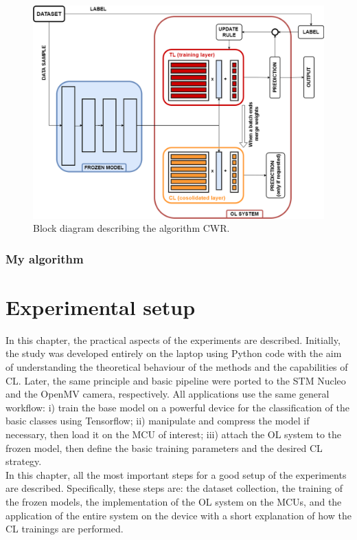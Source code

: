 \documentclass[12pt]{report}
\begin{document}
\begin{figure}[h!]
    \centering
    \includegraphics[width=120mm]{Figures/Chapter3/CWR.png} 
    \caption{Block diagram describing the algorithm CWR.}
    \label{fig:block_diag_CWR}    
\end{figure}

\subsection{My algorithm}




\chapter{Experimental setup}

In this chapter, the practical aspects of the experiments are described. Initially, the study was developed entirely on the laptop using Python code with the aim of understanding the theoretical behaviour of the methods and the capabilities of CL. Later, the same principle and basic pipeline were ported to the STM Nucleo and the OpenMV camera, respectively. All applications use the same general workflow: i) train the base model on a powerful device for the classification of the basic classes using Tensorflow; ii) manipulate and compress the model if necessary, then load it on the MCU of interest; iii) attach the OL system to the frozen model, then define the basic training parameters and the desired CL strategy. \\
In this chapter, all the most important steps for a good setup of the experiments are described. Specifically, these steps are: the dataset collection, the training of the frozen models, the implementation of the OL system on the MCUs, and the application of the entire system on the device with a short explanation of how the CL trainings are performed.
\end{document}

